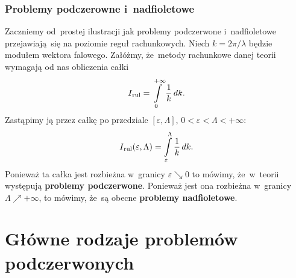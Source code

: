 \documentclass[10pt,t]{beamer}
\begin{document}
\begin{frame}[label=sld-Problemy-podczerwone-i-nadfioletowe]
  \frametitle{Problemy podczerowne i~nadfioletowe}


  Zaczniemy od~prostej ilustracji jak problemy podczerwone i~nadfioletowe
  przejawiają~się na poziomie reguł rachunkowych. Niech $k = 2 \pi / \lambda$
  będzie modułem wektora falowego. Załóżmy, że~metody rachunkowe danej
  teorii wymagają od nas obliczenia całki
  \begin{equation}
    \label{eq:Problemy-podczerwone-i-nadfioletowe-01}
    I_{ \hspace{0.05em} \text{rul} } = \int\limits_{ 0 }^{ +\infty } \frac{ 1 }{ k } \, dk.
  \end{equation}
  Zastąpimy ją przez całkę po przedziale $[ \varepsilon, \Lambda ]$, $0 < \varepsilon < \Lambda < +\infty$:
  \begin{equation}
    \label{eq:Problemy-podczerwone-i-nadfioletowe-02}
    I_{ \hspace{0.05em} \text{rul} }( \varepsilon, \Lambda ) =
    \int\limits_{ \varepsilon }^{ \Lambda } \frac{ 1 }{ k } \, dk.
  \end{equation}
  Ponieważ ta całka jest rozbieżna w~granicy $\varepsilon \searrow 0$ to mówimy,
  że~w~teorii występują \textbf{problemy podczerwone}. Ponieważ jest ona
  rozbieżna w~granicy $\Lambda \nearrow +\infty$, to mówimy, że~są obecne
  \textbf{problemy nadfioletowe}.

\end{frame}










\section{Główne rodzaje problemów podczerwonych}
\end{document}
